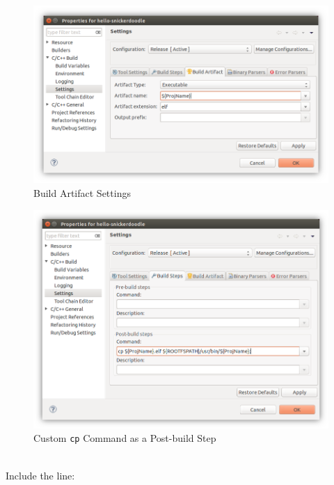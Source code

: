 \begin{figure}
	\centering
	\includegraphics{images/Build_Artifact.png}
	\caption{Build Artifact Settings}
	\label{fig:buildartifact}
\end{figure}



\begin{figure}
	\centering
	\includegraphics{images/Post_Build_Steps.png}
	\caption{Custom \texttt{cp} Command as a Post-build Step}
	\label{fig:postbuildstep}
\end{figure}

~\\
\noindent
Include the line: \\


